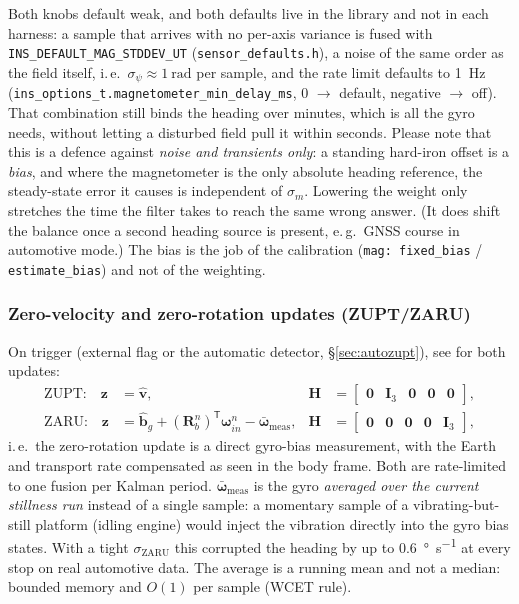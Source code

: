 \documentclass[11pt,a4paper]{article}
\newcommand{\vect}[1]{\bm{#1}}
\newcommand{\mat}[1]{\bm{#1}}
\newcommand{\T}{^{\mathsf{T}}}
\newcommand{\nframe}{n}
\newcommand{\bframe}{b}
\newcommand{\Rbn}{\mat{R}_{\bframe}^{\nframe}}
\newcommand{\code}[1]{\texttt{#1}}
\begin{document}
Both knobs default weak, and both defaults live in the
library and not in each harness: a sample that arrives with no
per-axis variance is fused with \code{INS\_\allowbreak{}DEFAULT\_\allowbreak{}MAG\_\allowbreak{}STDDEV\_\allowbreak{}UT}
(\code{sensor\_\allowbreak{}defaults.h}), a noise of the same order as the field
itself, i.\,e.\ $\sigma_\psi \approx \SI{1}{\radian}$ per sample, and the
rate limit defaults to \SI{1}{\hertz}
(\code{ins\_\allowbreak{}options\_\allowbreak{}t.magnetometer\_\allowbreak{}min\_\allowbreak{}delay\_\allowbreak{}ms}, 0 $\to$ default,
negative $\to$ off). That combination still binds the heading over
minutes, which is all the gyro needs, without letting a disturbed field
pull it within seconds. Please note that this is a defence against
\emph{noise and transients only}: a standing hard-iron offset is a
\emph{bias}, and where the magnetometer is the only absolute heading
reference, the steady-state error it causes is independent of $\sigma_m$.
Lowering the weight only stretches the time the filter takes to reach
the same wrong answer. (It does shift the balance once a second heading
source is present, e.\,g.\ GNSS course in automotive mode.) The bias is the
job of the calibration
(\code{mag: fixed\_\allowbreak{}bias} / \code{estimate\_\allowbreak{}bias}) and not of the weighting.

\subsubsection{Zero-velocity and zero-rotation updates (ZUPT/ZARU)}

On trigger (external flag or the automatic detector,
\S\ref{sec:autozupt}), see \cite{zwiener2019} for both updates:
\begin{align}
  \text{ZUPT:} \quad
  \vect{z} &= \hat{\vect{v}}, &
  \mat{H} &= \begin{bmatrix}
    \mat{0} & \mat{I}_3 & \mat{0} & \mat{0} & \mat{0}
  \end{bmatrix}, \\
  \text{ZARU:} \quad
  \vect{z} &= \hat{\vect{b}}_g
    + (\Rbn)\T\vect{\omega}^\nframe_{i\nframe}
    - \bar{\vect{\omega}}_{\text{meas}}, &
  \mat{H} &= \begin{bmatrix}
    \mat{0} & \mat{0} & \mat{0} & \mat{0} & \mat{I}_3
  \end{bmatrix},
\end{align}
i.\,e.\ the zero-rotation update is a direct gyro-bias measurement, with
the Earth and transport rate compensated as seen in the body frame. Both are
rate-limited to one fusion per Kalman period.
$\bar{\vect{\omega}}_{\text{meas}}$ is the gyro \emph{averaged over the
current stillness run} instead of a single sample: a momentary sample
of a vibrating-but-still platform (idling engine) would inject the
vibration directly into the gyro bias states. With a tight
$\sigma_{\text{ZARU}}$ this corrupted the heading by up to
\SI{0.6}{\degree\per\second} at every stop on real automotive data. The
average is a running mean and not a median: bounded memory and $O(1)$ per
sample (WCET rule).
\end{document}

